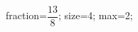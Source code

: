 \documentclass[exercice]{thedocument}%
\begin{document}
%
\>fraction=$\dfrac{13}8$;%
\>size=4;%
\>max=2;%
%
\end{document}
